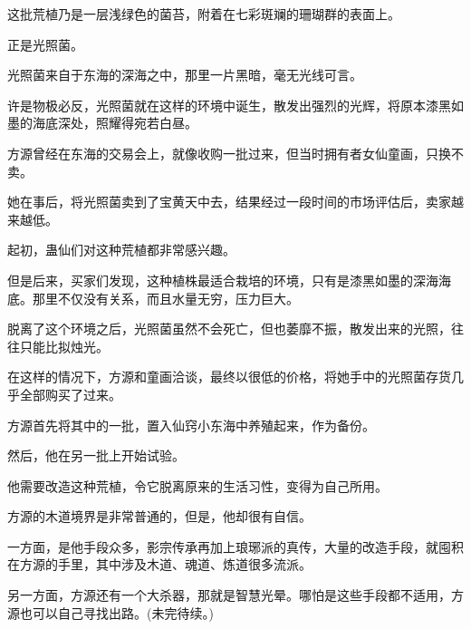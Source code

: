 \begin{this_body}
这批荒植乃是一层浅绿色的菌苔，附着在七彩斑斓的珊瑚群的表面上。

正是光照菌。

光照菌来自于东海的深海之中，那里一片黑暗，毫无光线可言。

许是物极必反，光照菌就在这样的环境中诞生，散发出强烈的光辉，将原本漆黑如墨的海底深处，照耀得宛若白昼。

方源曾经在东海的交易会上，就像收购一批过来，但当时拥有者女仙童画，只换不卖。

她在事后，将光照菌卖到了宝黄天中去，结果经过一段时间的市场评估后，卖家越来越低。

起初，蛊仙们对这种荒植都非常感兴趣。

但是后来，买家们发现，这种植株最适合栽培的环境，只有是漆黑如墨的深海海底。那里不仅没有关系，而且水量无穷，压力巨大。

脱离了这个环境之后，光照菌虽然不会死亡，但也萎靡不振，散发出来的光照，往往只能比拟烛光。

在这样的情况下，方源和童画洽谈，最终以很低的价格，将她手中的光照菌存货几乎全部购买了过来。

方源首先将其中的一批，置入仙窍小东海中养殖起来，作为备份。

然后，他在另一批上开始试验。

他需要改造这种荒植，令它脱离原来的生活习性，变得为自己所用。

方源的木道境界是非常普通的，但是，他却很有自信。

一方面，是他手段众多，影宗传承再加上琅琊派的真传，大量的改造手段，就囤积在方源的手里，其中涉及木道、魂道、炼道很多流派。

另一方面，方源还有一个大杀器，那就是智慧光晕。哪怕是这些手段都不适用，方源也可以自己寻找出路。(未完待续。)

\end{this_body}


